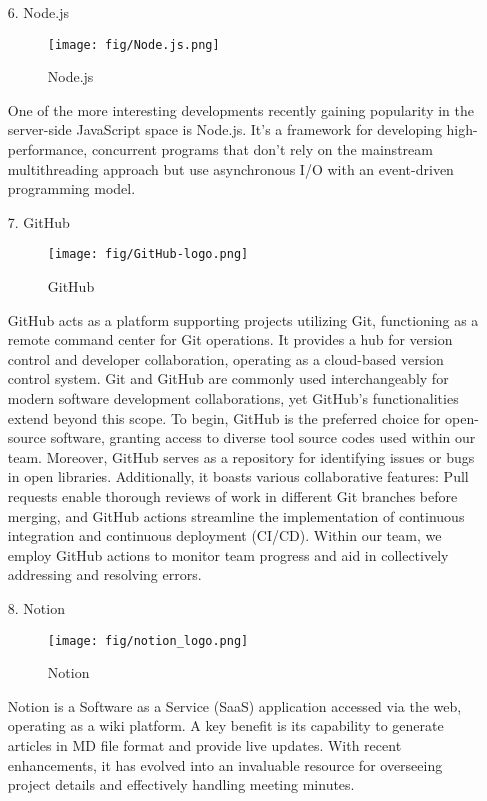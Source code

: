\documentclass[conference]{IEEEtran}
\begin{document}
\begin{enumerate}
    \item[6.]Node.js \cite{tilkov2010node}
    \begin{figure}[h]
    \centering
    \texttt{[image: fig/Node.js.png]}
    \label{fig:Node.js}
    \caption{Node.js} 
    \end{figure}
    \item[]One of the more interesting developments recently gaining popularity in the server-side JavaScript space is Node.js. It's a framework for developing high-performance, concurrent programs that don't rely on the mainstream multithreading approach but use asynchronous I/O with an event-driven programming model.\\
    
    \item[7.]GitHub
    \begin{figure}[h]
    \centering
    \texttt{[image: fig/GitHub-logo.png]}
    \label{fig:GitHub}
    \caption{GitHub} 
    \end{figure}
    \item[]GitHub acts as a platform supporting projects utilizing Git, functioning as a remote command center for Git operations. It provides a hub for version control and developer collaboration, operating as a cloud-based version control system. Git and GitHub are commonly used interchangeably for modern software development collaborations, yet GitHub's functionalities extend beyond this scope. To begin, GitHub is the preferred choice for open-source software, granting access to diverse tool source codes used within our team. Moreover, GitHub serves as a repository for identifying issues or bugs in open libraries. Additionally, it boasts various collaborative features: Pull requests enable thorough reviews of work in different Git branches before merging, and GitHub actions streamline the implementation of continuous integration and continuous deployment (CI/CD). Within our team, we employ GitHub actions to monitor team progress and aid in collectively addressing and resolving errors.\\ 

    \item[8.]Notion 
    \begin{figure}[h]
    \centering
    \texttt{[image: fig/notion\_logo.png]}
    \label{fig:Notion}
    \caption{Notion} 
    \end{figure}
    \item[]Notion is a Software as a Service (SaaS) application accessed via the web, operating as a wiki platform. A key benefit is its capability to generate articles in MD file format and provide live updates. With recent enhancements, it has evolved into an invaluable resource for overseeing project details and effectively handling meeting minutes. \\ 
    

\end{enumerate}
\end{document}
